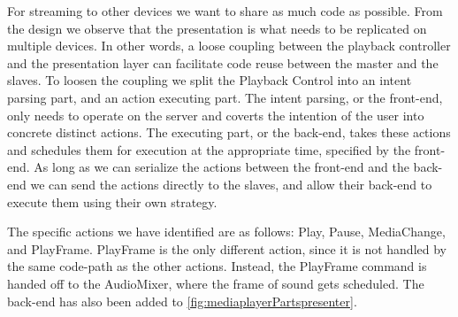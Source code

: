 For streaming to other devices we want to share as much code as
possible. From the design we observe that the presentation is what needs
to be replicated on multiple devices. In other words, a loose coupling
between the playback controller and the presentation layer can
facilitate code reuse between the master and the slaves. To loosen the
coupling we split the Playback Control into an intent parsing part, and
an action executing part. The intent parsing, or the front-end, only
needs to operate on the server and coverts the intention of the user
into concrete distinct actions. The executing part, or the back-end,
takes these actions and schedules them for execution at the appropriate
time, specified by the front-end. As long as we can serialize the
actions between the front-end and the back-end we can send the actions
directly to the slaves, and allow their back-end to execute them using
their own strategy.

The specific actions we have identified are as follows: Play, Pause,
MediaChange, and PlayFrame. PlayFrame is the only different action, since
it is not handled by the same code-path as the other actions. Instead, the
PlayFrame command is handed off to the AudioMixer, where the frame of
sound gets scheduled. The back-end has also been added to
\cref{fig:mediaplayerPartspresenter}.

